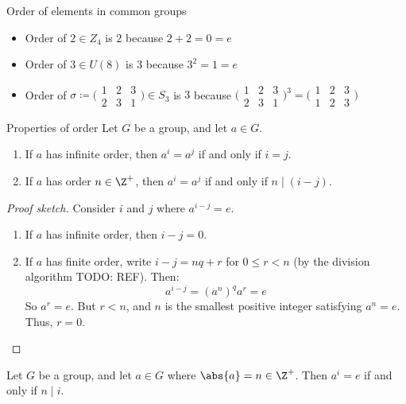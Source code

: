 \begin{exbox}{Order of elements in common groups}{}
    \begin{itemize}
        \item Order of $2 \in Z_4$ is $2$ because $2 + 2 = 0 = e$
        \item Order of $3 \in U(8)$ is $3$ because $3^2 = 1 = e$
        \item Order of $\sigma \coloneq \big(\begin{smallmatrix} 1&2&3 \\ 2&3&1 \end{smallmatrix} \big) \in S_3$ is $3$ because $\big( \begin{smallmatrix} 1&2&3 \\ 2&3&1 \end{smallmatrix} \big)^3 = \big( \begin{smallmatrix} 1&2&3 \\ 1&2&3 \end{smallmatrix} \big)$
    \end{itemize}
\end{exbox}

\begin{thmbox}{Properties of order}{}
    Let $G$ be a group, and let $a \in G$.
    \begin{enumerate}
        \item If $a$ has infinite order, then $a^i = a^j$ if and only if $i = j$.
        \item If $a$ has order $n \in \Z^+$, then $a^i = a^j$ if and only if $n \mid (i - j)$.
    \end{enumerate}
    \tcblower
    \begin{proof}[Proof sketch]
        Consider $i$ and $j$ where $a^{i-j} = e$.
        \begin{enumerate}
            \item If $a$ has infinite order, then $i - j = 0$.
            \item If $a$ has finite order, write $i - j = nq + r$ for $0 \leq r < n$ (by the division algorithm TODO: REF). Then:
            \[ a^{i-j} = (a^n)^q a^r = e \]
            So $a^r = e$. But $r < n$, and $n$ is the smallest positive integer satisfying $a^n = e$. Thus, $r = 0$.
        \end{enumerate}
    \end{proof}
\end{thmbox}

\begin{corbox}{}{}
    Let $G$ be a group, and let $a \in G$ where $\abs{a} = n \in \Z^+$. Then $a^i = e$ if and only if $n \mid i$.
\end{corbox}

